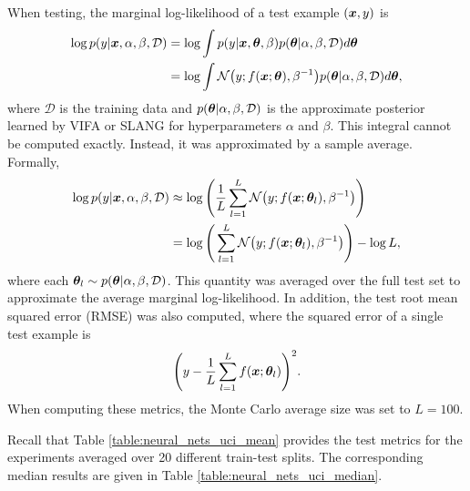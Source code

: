\documentclass[10pt]{article} %
\begin{document}
When testing, the marginal log-likelihood of a test example $({\bm{x}}, y)$ is
\begin{align}
\begin{split}
	\log p(y | {\bm{x}}, \alpha, \beta, \mathcal{D}) 
	& = \log \int p(y | {\bm{x}}, {\bm{\theta}}, \beta) p({\bm{\theta}} | \alpha, \beta, \mathcal{D}) d{\bm{\theta}} \\
	& = \log \int \mathcal{N}\big(y; f({\bm{x}}; {\bm{\theta}}), \beta^{-1}\big) p({\bm{\theta}} | \alpha, \beta, \mathcal{D}) d{\bm{\theta}},
\end{split}
\end{align}
where $\mathcal{D}$ is the training data and $p({\bm{\theta}} | \alpha, \beta, \mathcal{D})$ is the approximate posterior learned by VIFA or SLANG for hyperparameters $\alpha$ and $\beta$. This integral cannot be computed exactly. Instead, it was approximated by a sample average. Formally, 
\begin{align}
\begin{split}
	\log p(y | {\bm{x}}, \alpha, \beta, \mathcal{D}) 
	& \approx \log \Bigg( \frac{1}{L} \sum_{l=1}^L \mathcal{N}\big(y; f({\bm{x}}; {\bm{\theta}}_l), \beta^{-1}\big) \Bigg) \\
	& = \log \Bigg( \sum_{l=1}^L \mathcal{N}\big(y; f({\bm{x}}; {\bm{\theta}}_l), \beta^{-1}\big) \Bigg) - \log L,
\end{split}
\end{align}
where each ${\bm{\theta}}_l \sim p({\bm{\theta}} | \alpha, \beta, \mathcal{D})$. This quantity was averaged over the full test set to approximate the average marginal log-likelihood. In addition, the test root mean squared error (RMSE) was also computed, where the squared error of a single test example is
\begin{equation}
	\Bigg(y - \frac{1}{L} \sum_{l=1}^L f({\bm{x}}; {\bm{\theta}}_l)\Bigg)^2.
\end{equation}
When computing these metrics, the Monte Carlo average size was set to $L=100$.

Recall that Table \ref{table:neural_nets_uci_mean} provides the test metrics for the experiments averaged over 20 different train-test splits. The corresponding median results are given in Table \ref{table:neural_nets_uci_median}.
\end{document}
